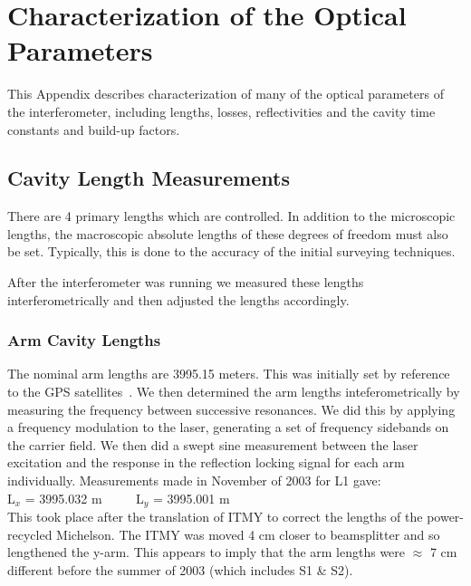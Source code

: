 \chapter{Characterization of the Optical Parameters}
\label{app:optics}



This Appendix describes characterization of many of the optical parameters of the
interferometer, including lengths, losses, reflectivities and
the cavity time constants and build-up factors.


\section{Cavity Length Measurements}

There are 4 primary lengths which are controlled. In addition to the microscopic
lengths, the macroscopic absolute lengths of these degrees of freedom must also
be set. Typically, this is done to the accuracy of the initial surveying techniques.

After the interferometer was running we measured these lengths interferometrically
and then adjusted the lengths accordingly.


\subsection{Arm Cavity Lengths}

The nominal arm lengths are 3995.15 meters. This was initially set by reference
to the GPS satellites~\cite{Rai:GPS}. We then determined the arm lengths 
inteferometrically by measuring the frequency between successive resonances. We
did this by applying a frequency modulation to the laser, generating a set of
frequency sidebands on the carrier field. We then did a swept sine measurement
between the laser excitation and the response in the reflection locking signal
for each arm individually. Measurements made in November of 2003 for L1 gave: \\

L$_x$ = 3995.032 m  $\qquad$  L$_y$ = 3995.001 m  \\

This took place after the translation of ITMY to correct the lengths of the
power-recycled Michelson. The ITMY was moved 4 cm closer to beamsplitter and
so lengthened the y-arm. This appears to imply that the arm lengths were 
$\approx$ 7 cm different before the summer of 2003 (which includes S1 \& S2).

